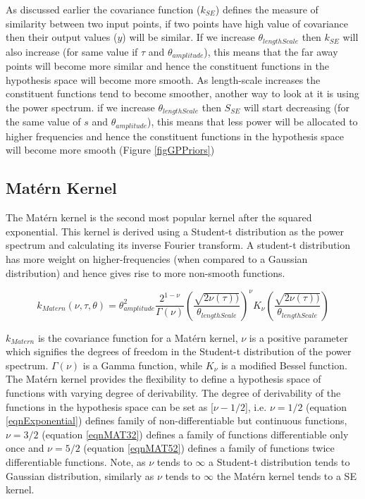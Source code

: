 As discussed earlier the covariance function ($k_{SE}$) defines the measure of similarity between two input points, if two points have high value of covariance then their output values ($y$) will be similar. If we increase $\theta_{lengthScale}$ then $k_{SE}$ will also increase (for same value if $\tau$ and $\theta_{amplitude}$), this means that the far away points will become more similar and hence the constituent functions in the hypothesis space will become more smooth. As length-scale increases the constituent functions tend to become smoother, another way to look at it is using the power spectrum. if we increase $\theta_{lengthScale}$ then $S_{SE}$ will start decreasing (for the same value of $s$ and $\theta_{amplitude}$), this means that less power will be allocated to higher frequencies and hence the constituent functions in the hypothesis space will become more smooth (Figure \ref{figGPPriors})

\subsection{Mat\'ern Kernel}\label{subsecCh4MaternKernel}
The Mat\'ern kernel is the second most popular kernel after the squared exponential. This kernel is derived using a Student-t distribution as the power spectrum and calculating its inverse Fourier transform. A student-t distribution has more weight on higher-frequencies (when compared to a Gaussian distribution) and hence gives rise to more non-smooth functions. 

\begin{equation}
k_{Matern}(\nu, \tau, \theta) = \theta_{amplitude}^2\frac{2^{1- \nu }}{\Gamma (\nu)}\left ( \frac{\sqrt{2\nu(\tau))}}{\theta_{lengthScale}} \right )^{\nu}K_{\nu}\left ( \frac{\sqrt{2\nu(\tau))}}{\theta_{lengthScale}} \right)
\end{equation}

$k_{Matern}$ is the covariance function for a Mat\'ern kernel, $\nu$ is a positive parameter which signifies the degrees of freedom in the Student-t distribution of the power spectrum. $\Gamma (\nu)$ is a Gamma function, while $K_{\nu}$ is a modified Bessel function. The Mat\'ern kernel provides the flexibility to define a hypothesis space of functions with varying degree of derivability. The degree of derivability of the functions in the hypothesis space can be set as [$\nu-1/2$], i.e.  $\nu = 1/2$ (equation \ref{eqnExponential}) defines family of non-differentiable but continuous functions, $\nu = 3/2$ (equation \ref{eqnMAT32}) defines a family of functions differentiable only once and $\nu = 5/2$ (equation \ref{eqnMAT52}) defines a family of functions twice differentiable functions. Note, as $\nu$ tends to $\infty$ a Student-t distribution tends to Gaussian distribution, similarly as $\nu$ tends to $\infty$ the Mat\'ern kernel tends to a SE kernel. 

